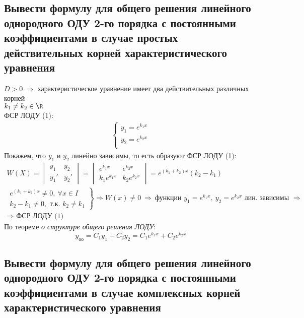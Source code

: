 \subsection{Вывести формулу для общего решения линейного однородного ОДУ 2-го порядка с постоянными коэффициентами в случае простых действительных корней характеристического уравнения}

 $D > 0\ \Rightarrow$ характеристическое уравнение имеет два действительных различных корней\\
$k_1 \ne k_2 \in \R$\\
ФСР ЛОДУ (1):
\begin{gather*}
    \left\{ \begin{aligned}
        y_1 = e^{k_1x} \\
        y_2 = e^{k_2x} \\
    \end{aligned} \right.
\end{gather*}
Покажем, что $y_1$ и $y_2$ линейно зависимы, то есть образуют ФСР ЛОДУ (1):
\begin{gather*}
    W(X) = \begin{vmatrix}
        y_1 & y_2 \\
        y_1' & y_2' 
    \end{vmatrix} = \begin{vmatrix}
        e^{k_1x} & e^{k_2x} \\
        k_1e^{k_1x} & k_2e^{k_2x} 
    \end{vmatrix} = e^{(k_1 + k_2) x} (k_2 - k_1) \\
    \left. \begin{aligned}
        e^{(k_1 + k_2) x} \ne 0,\ \forall x \in I \\
        k_2 - k_1 \ne 0, \text{ т.к. } k_2 \ne k_1
    \end{aligned} \right\} \Rightarrow W(x) \ne 0\ \Rightarrow\ \text{функции } y_1 = e^{k_1x},\ y_2  = e^{k_2x} \text{ лин. зависимы } \Rightarrow \\
    \Rightarrow \text{ ФСР ЛОДУ (1)}
\end{gather*}
По теореме \textit{о структуре общего решения ЛОДУ}:
\[
    y_{\text{оо}} = C_1y_1 + C_2y_2 = C_1 e^{k_1x} + C_2 e^{k_2x}
\]


\subsection{Вывести формулу для общего решения линейного однородного ОДУ 2-го порядка с постоянными коэффициентами в случае комплексных корней характеристического уравнения}

